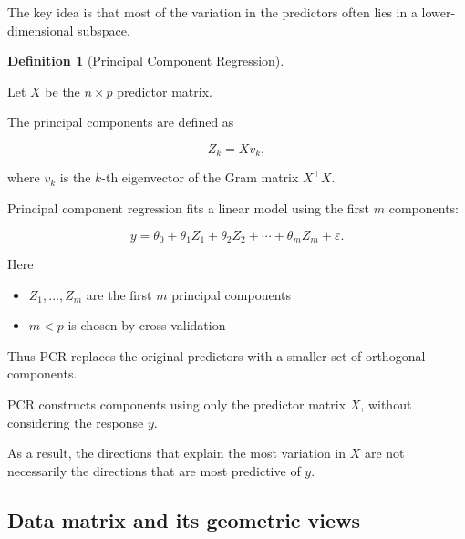 \documentclass[
  letterpaper,
  DIV=11,
  numbers=noendperiod]{scrreprt}
\providecommand{\tightlist}{%
  \setlength{\itemsep}{0pt}\setlength{\parskip}{0pt}}
\theoremstyle{definition}
\newtheorem{definition}{Definition}[chapter]
\theoremstyle{definition}
\theoremstyle{plain}
\theoremstyle{plain}
\theoremstyle{remark}
\begin{document}
The key idea is that most of the variation in the predictors often lies
in a lower-dimensional subspace.

\begin{definition}[Principal Component
Regression]\protect\hypertarget{def-pcr}{}\label{def-pcr}

Let \(X\) be the \(n \times p\) predictor matrix.

The principal components are defined as

\[
Z_k = X v_k,
\]

where \(v_k\) is the \(k\)-th eigenvector of the Gram matrix
\(X^\top X\).

Principal component regression fits a linear model using the first \(m\)
components:

\[
y = \theta_0 + \theta_1 Z_1 + \theta_2 Z_2 + \cdots + \theta_m Z_m + \varepsilon.
\]

Here

\begin{itemize}
\tightlist
\item
  \(Z_1,\ldots,Z_m\) are the first \(m\) principal components
\item
  \(m < p\) is chosen by cross-validation
\end{itemize}

\end{definition}

Thus PCR replaces the original predictors with a smaller set of
orthogonal components.

\begin{tcolorbox}[enhanced jigsaw, arc=.35mm, bottomrule=.15mm, bottomtitle=1mm, breakable, colback=white, colbacktitle=quarto-callout-note-color!10!white, colframe=quarto-callout-note-color-frame, coltitle=black, left=2mm, leftrule=.75mm, opacityback=0, opacitybacktitle=0.6, rightrule=.15mm, title=\textcolor{quarto-callout-note-color}{\faInfo}\hspace{0.5em}{Key feature of PCR}, titlerule=0mm, toprule=.15mm, toptitle=1mm]

PCR constructs components using only the predictor matrix \(X\), without
considering the response \(y\).

As a result, the directions that explain the most variation in \(X\) are
not necessarily the directions that are most predictive of \(y\).

\end{tcolorbox}

\subsection{Data matrix and its geometric
views}\label{data-matrix-and-its-geometric-views}
\end{document}
